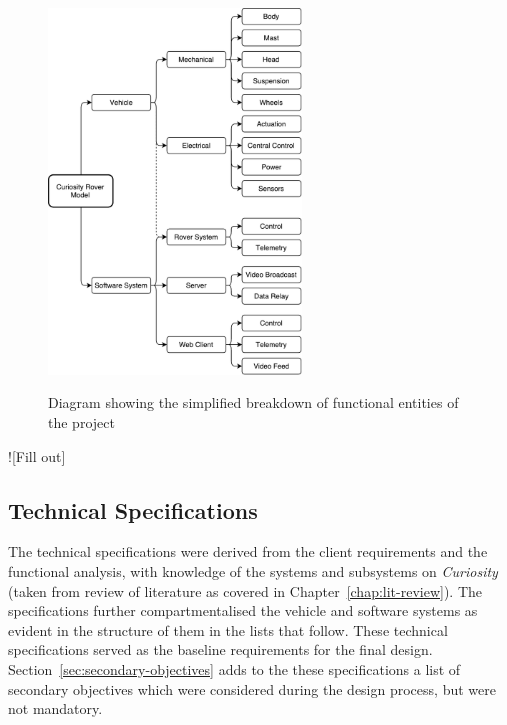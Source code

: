     \begin{figure}[h]
      \centering
      \includegraphics[width=0.6\textwidth]{figures/specs-functionalBreakdown}
      \label{fig:specs-functionalBreakdown}
      \caption[Diagram showing the simplified breakdown of functional entities of the project]{Diagram showing the simplified breakdown of functional entities of the project}
    \end{figure}
    
    ![Fill out]
    
  \subsection{Technical Specifications}
    The technical specifications were derived from the client requirements and the functional analysis, with knowledge of the systems and subsystems on \textit{Curiosity} (taken from review of literature as covered in Chapter~\ref{chap:lit-review}). The specifications further compartmentalised the vehicle and software systems as evident in the structure of them in the lists that follow. These technical specifications served as the baseline requirements for the final design. Section~\ref{sec:secondary-objectives} adds to the these specifications a list of secondary objectives which were considered during the design process, but were not mandatory.
    
